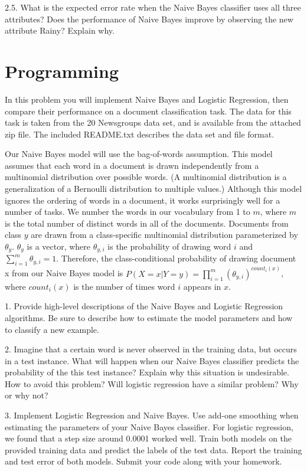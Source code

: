 \documentclass{article}
\theoremstyle{definition}
\theoremstyle{definition}
\theoremstyle{remark}
\begin{document}
2.5. What is the expected error rate when the Naive Bayes classifier uses all three attributes? Does
the performance of Naive Bayes improve by observing the new attribute Rainy? Explain why.





\section*{Programming}
In this problem you will implement Naive Bayes and Logistic Regression, then compare their performance on a
document classification task. The data for this task is taken from the 20 Newsgroups data set, and is available
from the attached zip file. The included README.txt describes the data set and file format.

Our Naive Bayes model will use the bag-of-words assumption. This model assumes that each word in a
document is drawn independently from a multinomial distribution over possible words. (A multinomial
distribution is a generalization of a Bernoulli distribution to multiple values.) Although this model ignores
the ordering of words in a document, it works surprisingly well for a number of tasks. We number the words
in our vocabulary from 1 to $m$, where $m$ is the total number of distinct words in all of the documents.
Documents from class $y$ are drawn from a class-specific multinomial distribution parameterized by $\theta_y$. $\theta_y$ is
a vector, where $\theta_{y,i}$ is the probability of drawing word $i$ and $\sum_{i=1}^m \theta_{y,i}=1$.
Therefore, the class-conditional probability of drawing document x from our Naive Bayes model is
$P(X = x|Y = y) = \prod_{i=1}^m (\theta_{y,i})^{count_i(x)}$, where $count_i(x)$ is the number of times word $i$ appears in $x$.

1. Provide high-level descriptions of the Naive Bayes and Logistic Regression algorithms. Be
sure to describe how to estimate the model parameters and how to classify a new example.

2. Imagine that a certain word is never observed in the training data, but occurs in a test
instance. What will happen when our Naive Bayes classifier predicts the probability of the this test
instance? Explain why this situation is undesirable. How to avoid this problem? Will logistic regression have a similar problem?
Why or why not?

3. Implement Logistic Regression and Naive Bayes. Use add-one smoothing when estimating
the parameters of your Naive Bayes classifier. For logistic regression, we found that a step size around
0.0001 worked well. Train both models on the provided training data and predict the labels of the test
data. Report the training and test error of both models. Submit your code along with your homework.
\end{document}
